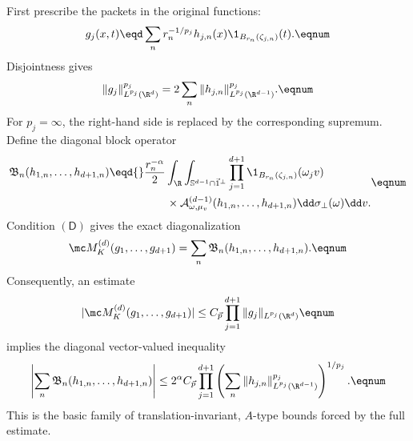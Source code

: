 First prescribe the packets in the original functions:
\[
  g_j(x,t)
  \eqd
  \sum_n r_n^{-1/p_j}h_{j,n}(x)
  \1_{B_{r_n}(\zeta_{j,n})}(t).
  \eqnum \label{eq:original-packet-series}
\]
Disjointness gives
\[
  \|g_j\|_{L^{p_j}(\R^d)}^{p_j}
  =2\sum_n\|h_{j,n}\|_{L^{p_j}(\R^{d-1})}^{p_j}.
  \eqnum \label{eq:original-packet-series-norms}
\]
For \(p_j=\infty\), the right-hand side is replaced by the corresponding
supremum.  Define the diagonal block operator
\[
\begin{aligned}
  \mathfrak B_n(h_{1,n},\ldots,h_{d+1,n})
  \eqd{}&
  \frac{r_n^{-\alpha}}2
  \int_\R\int_{\mathbb S^{d-1}\cap\vec1^\perp}
  \prod_{j=1}^{d+1}
  \1_{B_{r_n}(\zeta_{j,n})}(\omega_jv)\\
  &\qquad\times
  \mathcal A_{\omega,\mu_v}^{(d-1)}
  (h_{1,n},\ldots,h_{d+1,n})
  \dd\sigma_\perp(\omega)\dd v.
\end{aligned}
\eqnum \label{eq:diagonal-block-operator}
\]
Condition \((\mathsf D)\) gives the exact diagonalization
\[
  \mc M_K^{(d)}(g_1,\ldots,g_{d+1})
  =\sum_n
  \mathfrak B_n(h_{1,n},\ldots,h_{d+1,n}).
  \eqnum \label{eq:diagonalization-of-full-form}
\]
Consequently, an estimate
\[
  |\mc M_K^{(d)}(g_1,\ldots,g_{d+1})|
  \le C_{\vec p}\prod_{j=1}^{d+1}
  \|g_j\|_{L^{p_j}(\R^d)}
  \eqnum \label{eq:full-form-bound}
\]
implies the diagonal vector-valued inequality
\[
  \left|
  \sum_n\mathfrak B_n
  (h_{1,n},\ldots,h_{d+1,n})
  \right|
  \le
  2^\alpha C_{\vec p}
  \prod_{j=1}^{d+1}
  \left(
    \sum_n
    \|h_{j,n}\|_{L^{p_j}(\R^{d-1})}^{p_j}
  \right)^{1/p_j}.
  \eqnum \label{eq:diagonal-vector-valued-bound}
\]
This is the basic family of translation-invariant, \(A\)-type bounds
forced by the full estimate.

